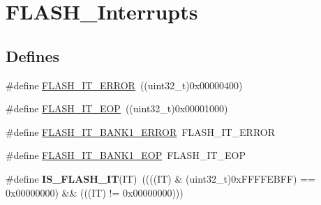 \hypertarget{group__FLASH__Interrupts}{
\section{FLASH\_\-Interrupts}
\label{group__FLASH__Interrupts}
}
\subsection*{Defines}
\begin{DoxyCompactItemize}
\item 
\#define \hyperlink{group__FLASH__Interrupts_ga61c74493d4c1f36ddaf563719d446a7d}{FLASH\_\-IT\_\-ERROR}~((uint32\_\-t)0x00000400)
\item 
\#define \hyperlink{group__FLASH__Interrupts_gaea20e80e1806d58a7544cfe8659e7f11}{FLASH\_\-IT\_\-EOP}~((uint32\_\-t)0x00001000)
\item 
\#define \hyperlink{group__FLASH__Interrupts_ga808627239be1bf9c2d8bfed36ec4db19}{FLASH\_\-IT\_\-BANK1\_\-ERROR}~FLASH\_\-IT\_\-ERROR
\item 
\#define \hyperlink{group__FLASH__Interrupts_gac8825e2ce2c0e6ca63a40a347bd351a9}{FLASH\_\-IT\_\-BANK1\_\-EOP}~FLASH\_\-IT\_\-EOP
\item 
\hypertarget{group__FLASH__Interrupts_ga46ee77d0be1f3e0a14ded0651163ae11}{
\#define {\bfseries IS\_\-FLASH\_\-IT}(IT)~((((IT) \& (uint32\_\-t)0xFFFFEBFF) == 0x00000000) \&\& (((IT) != 0x00000000)))}
\label{group__FLASH__Interrupts_ga46ee77d0be1f3e0a14ded0651163ae11}

\end{DoxyCompactItemize}


